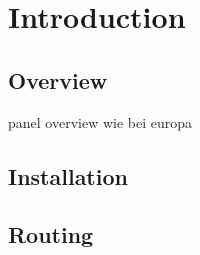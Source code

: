 \chapter{Introduction}

\section{Overview}
panel overview wie bei europa
\section{Installation}
\section{Routing}
